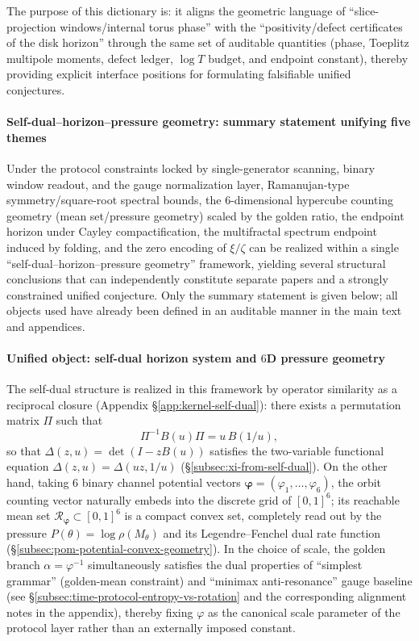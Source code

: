 The purpose of this dictionary is: it aligns the geometric language of ``slice-projection windows/internal torus phase'' with the ``positivity/defect certificates of the disk horizon'' through the same set of auditable quantities (phase, Toeplitz multipole moments, defect ledger, \(\log T\) budget, and endpoint constant), thereby providing explicit interface positions for formulating falsifiable unified conjectures.

\paragraph{Self-dual--horizon--pressure geometry: summary statement unifying five themes}
Under the protocol constraints locked by single-generator scanning, binary window readout, and the gauge normalization layer,
Ramanujan-type symmetry/square-root spectral bounds, the \(6\)-dimensional hypercube counting geometry (mean set/pressure geometry) scaled by the golden ratio, the endpoint horizon under Cayley compactification, the multifractal spectrum endpoint induced by folding, and the zero encoding of \(\xi/\zeta\)
can be realized within a single ``self-dual--horizon--pressure geometry'' framework, yielding several structural conclusions that can independently constitute separate papers and a strongly constrained unified conjecture. Only the summary statement is given below; all objects used have already been defined in an auditable manner in the main text and appendices.

\paragraph{Unified object: self-dual horizon system and \(6\)D pressure geometry}
The self-dual structure is realized in this framework by operator similarity as a reciprocal closure (Appendix \S\ref{app:kernel-self-dual}): there exists a permutation matrix \(\Pi\) such that
\[
\Pi^{-1}B(u)\Pi=u\,B(1/u),
\]
so that \(\Delta(z,u)=\det(I-zB(u))\) satisfies the two-variable functional equation \(\Delta(z,u)=\Delta(uz,1/u)\) (\S\ref{subsec:xi-from-self-dual}).
On the other hand, taking \(6\) binary channel potential vectors \(\boldsymbol{\varphi}=(\varphi_1,\dots,\varphi_6)\), the orbit counting vector naturally embeds into the discrete grid of \([0,1]^6\);
its reachable mean set \(\mathcal{R}_{\boldsymbol{\varphi}}\subset[0,1]^6\) is a compact convex set, completely read out by the pressure \(P(\theta)=\log\rho(M_\theta)\) and its Legendre--Fenchel dual rate function (\S\ref{subsec:pom-potential-convex-geometry}).
In the choice of scale, the golden branch \(\alpha=\varphi^{-1}\) simultaneously satisfies the dual properties of ``simplest grammar'' (golden-mean constraint) and ``minimax anti-resonance'' gauge baseline (see \S\ref{subsec:time-protocol-entropy-vs-rotation} and the corresponding alignment notes in the appendix), thereby fixing \(\varphi\) as the canonical scale parameter of the protocol layer rather than an externally imposed constant.

